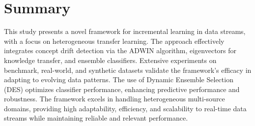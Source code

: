 \section{Summary}
\label{sec:6_summary}
This study presents a novel framework for incremental learning in data streams, with a focus on heterogeneous transfer learning. The approach effectively integrates concept drift detection via the ADWIN algorithm, eigenvectors for knowledge transfer, and ensemble classifiers. Extensive experiments on benchmark, real-world, and synthetic datasets validate the framework's efficacy in adapting to evolving data patterns. The use of Dynamic Ensemble Selection (DES) optimizes classifier performance, enhancing predictive performance and robustness. The framework excels in handling heterogeneous multi-source domains, providing high adaptability, efficiency, and scalability to real-time data streams while maintaining reliable and relevant performance.